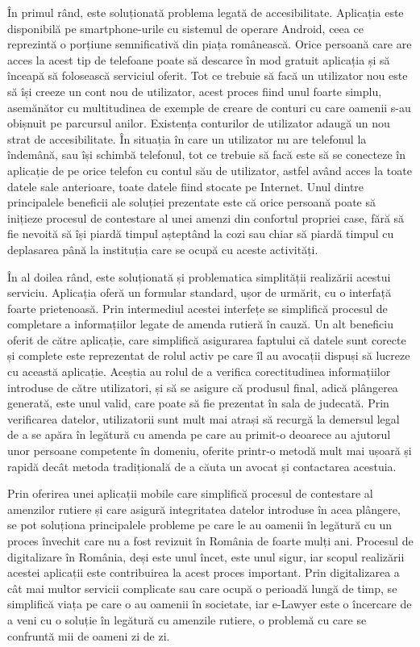 \documentclass[12pt,a4paper]{report}
\theoremstyle{definition}
\theoremstyle{remark}
\begin{document}
În primul rând, este soluționată problema legată de accesibilitate. Aplicația este disponibilă pe smartphone-urile cu sistemul de operare Android, ceea ce reprezintă o porțiune semnificativă din piața românească. Orice persoană care are acces la acest tip de telefoane poate să descarce în mod gratuit aplicația și să înceapă să folosească serviciul oferit. Tot ce trebuie să facă un utilizator nou este să își creeze un cont nou de utilizator, acest proces fiind unul foarte simplu, asemănător cu multitudinea de exemple de creare de conturi cu care oamenii s-au obișnuit pe parcursul anilor. Existența conturilor de utilizator adaugă un nou strat de accesibilitate. În situația în care un utilizator nu are telefonul la îndemână, sau își schimbă telefonul, tot ce trebuie să facă este să se conecteze în aplicație de pe orice telefon cu contul său de utilizator, astfel având acces la toate datele sale anterioare, toate datele fiind stocate pe Internet. Unul dintre principalele beneficii ale soluției prezentate este că orice persoană poate să inițieze procesul de contestare al unei amenzi din confortul propriei case, fără să fie nevoită să își piardă timpul așteptând la cozi sau chiar să piardă timpul cu deplasarea până la instituția care se ocupă cu aceste activități. 

În al doilea rând, este soluționată și problematica simplității realizării acestui serviciu. Aplicația oferă un formular standard, ușor de urmărit, cu o interfață foarte prietenoasă. Prin intermediul acestei interfețe se simplifică procesul de completare a informațiilor legate de amenda rutieră în cauză. Un alt beneficiu oferit de către aplicație, care simplifică asigurarea faptului că datele sunt corecte și complete este reprezentat de rolul activ pe care îl au avocații dispuși să lucreze cu această aplicație. Aceștia au rolul de a verifica corectitudinea informațiilor introduse de către utilizatori, și să se asigure că produsul final, adică plângerea generată, este unul valid, care poate să fie prezentat în sala de judecată. Prin verificarea datelor, utilizatorii sunt mult mai atrași să recurgă la demersul legal de a se apăra în legătură cu amenda pe care au primit-o deoarece au ajutorul unor persoane competente în domeniu, oferite printr-o metodă mult mai ușoară și rapidă decât metoda tradițională de a căuta un avocat și contactarea acestuia. 

Prin oferirea unei aplicații mobile care simplifică procesul de contestare al amenzilor rutiere și care asigură integritatea datelor introduse în acea plângere, se pot soluționa principalele probleme pe care le au oamenii în legătură cu un proces învechit care nu a fost revizuit în România de foarte mulți ani. Procesul de digitalizare în România, deși este unul încet, este unul sigur, iar scopul realizării acestei aplicații este contribuirea la acest proces important. Prin digitalizarea a cât mai multor servicii complicate sau care ocupă o perioadă lungă de timp, se simplifică viața pe care o au oamenii în societate, iar e-Lawyer este o încercare de a veni cu o soluție în legătură cu amenzile rutiere, o problemă cu care se confruntă mii de oameni zi de zi. 
\newpage
\end{document}
